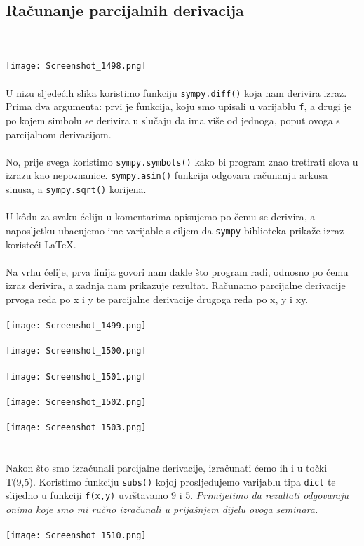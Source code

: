 \documentclass{article}
\begin{document}
\pagebreak

\subsection{Računanje parcijalnih derivacija}
\\~\\
\texttt{[image: Screenshot\_1498.png]}
\\~\\
U nizu sljedećih slika koristimo funkciju \texttt{sympy.diff()} koja nam derivira izraz. Prima dva argumenta: prvi je funkcija, koju smo upisali u varijablu \texttt{f}, a drugi je po kojem simbolu se derivira u slučaju da ima više od jednoga, poput ovoga s parcijalnom derivacijom.
\\~\\
No, prije svega koristimo \texttt{sympy.symbols()} kako bi program znao tretirati slova u izrazu kao nepoznanice. \texttt{sympy.asin()} funkcija odgovara računanju arkusa sinusa, a \texttt{sympy.sqrt()} korijena. 
\\~\\
U kôdu za svaku ćeliju u komentarima opisujemo po čemu se derivira, a naposljetku ubacujemo ime varijable s ciljem da \texttt{sympy} biblioteka prikaže izraz koristeći LaTeX.
\\~\\
Na vrhu ćelije, prva linija govori nam dakle što program radi, odnosno po čemu izraz derivira, a zadnja nam prikazuje rezultat. Računamo parcijalne derivacije prvoga reda po x i y te parcijalne derivacije drugoga reda po x, y i xy.
\\~\\
\texttt{[image: Screenshot\_1499.png]}
\\~\\
\texttt{[image: Screenshot\_1500.png]}
\\~\\
\texttt{[image: Screenshot\_1501.png]}
\\~\\
\texttt{[image: Screenshot\_1502.png]}
\\~\\
\texttt{[image: Screenshot\_1503.png]}
\\~\\
\pagebreak
\\
Nakon što smo izračunali parcijalne derivacije, izračunati ćemo ih i u točki T(9,5). Koristimo funkciju \texttt{subs()} kojoj prosljedujemo varijablu tipa \texttt{dict} te slijedno u funkciji \texttt{f(x,y)} uvrštavamo 9 i 5. \textit{Primijetimo da rezultati odgovaraju onima koje smo mi ručno izračunali u prijašnjem dijelu ovoga seminara.}
\\ \\
\texttt{[image: Screenshot\_1510.png]}
\end{document}
